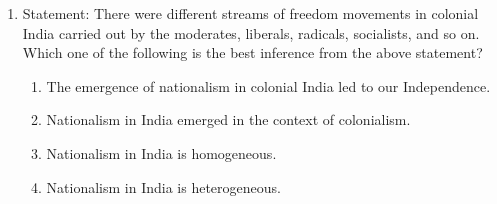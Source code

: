 \documentclass[journal,12pt,onecolumn]{IEEEtran}
\theoremstyle{remark}
\begin{document}
\begin{enumerate}
\item Statement: There were different streams of freedom movements in colonial India carried out by the moderates, liberals, radicals, socialists, and so on. Which one of the following is the best inference from the above statement?  
\par \hfill{}
\begin{enumerate}
\item The emergence of nationalism in colonial India led to our Independence.
\item Nationalism in India emerged in the context of colonialism.
\item Nationalism in India is homogeneous.
\item Nationalism in India is heterogeneous.
\end{enumerate}

\end{enumerate}
\end{document}
